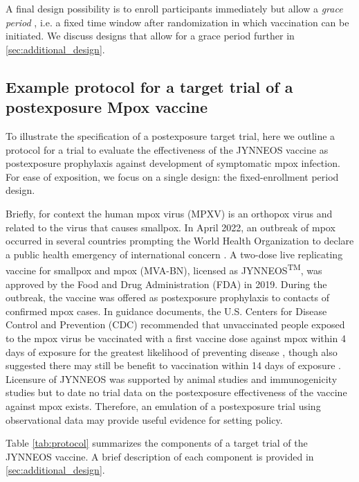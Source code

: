 \documentclass[11pt]{article}
\begin{document}
A final design possibility is to enroll participants immediately but allow a \textit{grace period} \cite{smith_emulation_2022,wanis_role_2022}, i.e. a fixed time window after randomization in which vaccination can be initiated. We discuss designs that allow for a grace period further in \ref{sec:additional_design}. 

\subsection{Example protocol for a target trial of a postexposure Mpox vaccine}

To illustrate the specification of a postexposure target trial, here we outline a protocol for a trial to evaluate the effectiveness of the JYNNEOS vaccine as postexposure prophylaxis against development of symptomatic mpox infection. For ease of exposition, we focus on a single design: the fixed-enrollment period design.

Briefly, for context the human mpox virus (MPXV) is an orthopox virus and related to the virus that causes smallpox. In April 2022, an outbreak of mpox occurred in several countries prompting the World Health Organization to declare a public health emergency of international concern \cite{nuzzo_who_2022}. A two-dose live replicating vaccine for smallpox and mpox (MVA-BN), licensed as JYNNEOS\textsuperscript{TM}, was approved by the Food and Drug Administration (FDA) in 2019. During the outbreak, the vaccine was offered as postexposure prophylaxis to contacts of confirmed mpox cases. In guidance documents, the U.S. Centers for Disease Control and Prevention (CDC) recommended that unvaccinated people exposed to the mpox virus be vaccinated with a first vaccine dose against mpox within 4 days of exposure for the greatest likelihood of preventing disease \cite{cdc_mpox_2023-1}, though also suggested there may still be benefit to vaccination within 14 days of exposure \cite{kecmanovic1975einfluss,sommer_1972_1974}. Licensure of JYNNEOS was supported by animal studies \cite{earl_rapid_2008,keckler_effects_2013,hatch_assessment_2013,samuelsson_survival_2008} and immunogenicity studies \cite{pittman_phase_2019} but to date no trial data on the postexposure effectiveness of the vaccine against mpox exists. Therefore, an emulation of a postexposure trial using observational data may provide useful evidence for setting policy.

Table \ref{tab:protocol} summarizes the components of a target trial of the JYNNEOS vaccine. A brief description of each component is provided in \ref{sec:additional_design}.
\end{document}
